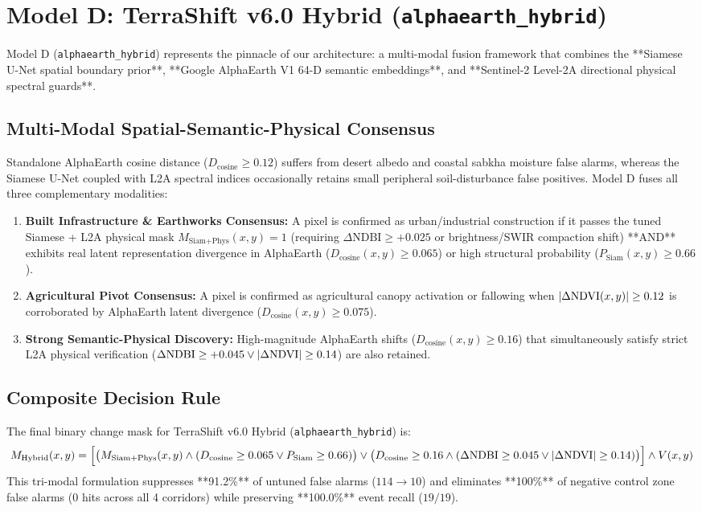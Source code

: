 \section{Model D: TerraShift v6.0 Hybrid (\texttt{alphaearth\_hybrid})}
\label{sec:ai_model_d}
Model D (\texttt{alphaearth\_hybrid}) represents the pinnacle of our architecture: a multi-modal fusion framework that combines the **Siamese U-Net spatial boundary prior**, **Google AlphaEarth V1 64-D semantic embeddings**, and **Sentinel-2 Level-2A directional physical spectral guards**.

\subsection{Multi-Modal Spatial-Semantic-Physical Consensus}
Standalone AlphaEarth cosine distance ($D_{\text{cosine}} \ge 0.12$) suffers from desert albedo and coastal sabkha moisture false alarms, whereas the Siamese U-Net coupled with L2A spectral indices occasionally retains small peripheral soil-disturbance false positives. Model D fuses all three complementary modalities:
\begin{enumerate}
    \item \textbf{Built Infrastructure \& Earthworks Consensus:} A pixel is confirmed as urban/industrial construction if it passes the tuned Siamese + L2A physical mask $M_{\text{Siam+Phys}}(x,y) = 1$ (requiring $\Delta\text{NDBI} \ge +0.025$ or brightness/SWIR compaction shift) **AND** exhibits real latent representation divergence in AlphaEarth ($D_{\text{cosine}}(x,y) \ge 0.065$) or high structural probability ($P_{\text{Siam}}(x,y) \ge 0.66$).
    \item \textbf{Agricultural Pivot Consensus:} A pixel is confirmed as agricultural canopy activation or fallowing when $\left\lvert\Delta\text{NDVI}(x,y)\right\rvert \ge 0.12$ is corroborated by AlphaEarth latent divergence ($D_{\text{cosine}}(x,y) \ge 0.075$).
    \item \textbf{Strong Semantic-Physical Discovery:} High-magnitude AlphaEarth shifts ($D_{\text{cosine}}(x,y) \ge 0.16$) that simultaneously satisfy strict L2A physical verification ($\Delta\text{NDBI} \ge +0.045 \lor \left\lvert\Delta\text{NDVI}\right\rvert \ge 0.14$) are also retained.
\end{enumerate}

\subsection{Composite Decision Rule}
The final binary change mask for TerraShift v6.0 Hybrid (\texttt{alphaearth\_hybrid}) is:
\begin{equation}
    M_{\text{Hybrid}}(x, y) = \Big[ \big( M_{\text{Siam+Phys}}(x, y) \land (D_{\text{cosine}} \ge 0.065 \lor P_{\text{Siam}} \ge 0.66) \big) \lor \big( D_{\text{cosine}} \ge 0.16 \land (\Delta\text{NDBI} \ge 0.045 \lor \left\lvert\Delta\text{NDVI}\right\rvert \ge 0.14) \big) \Big] \land V(x, y)
    \label{eq:mask_model_d}
\end{equation}
This tri-modal formulation suppresses **91.2\%** of untuned false alarms ($114 \to 10$) and eliminates **100\%** of negative control zone false alarms ($0$ hits across all 4 corridors) while preserving **100.0\%** event recall ($19/19$).

